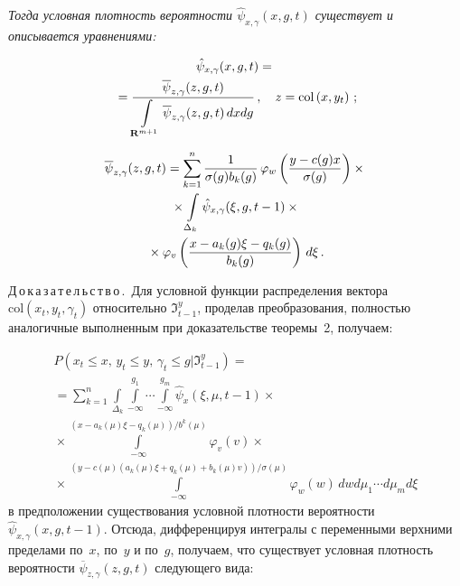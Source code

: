 \begin{multicols}{2}
  \textit{Тогда условная плотность вероятности $\hat{\psi}_{x,\gamma}(x,g,t)$ существует и 
описывается урав\-не\-ниями:}



\noindent
  \begin{multline}
  \hat{\psi}_{x,\gamma}(x,g,t) ={}\\
  {}=\displaystyle\frac{\displaystyle \overline{\psi}_{z,\gamma}(z,g,t)\mathstrut}{\displaystyle \int\limits_{\mathbf{R}^{m+1}}\overline{\psi}_{z,\gamma} (z,g,t)\,dx dg\mathstrut}\,, \quad
z=\mathrm{col}\left( x,y_t\right)\,;   \label{e9-b}
  \end{multline}
  
\vspace*{-12pt}
\noindent
\begin{multline}
  \overline{\psi}_{z,\gamma} (z,g,t) =\sum\limits_{k=1}^n \displaystyle\frac{\displaystyle 1\mathstrut}{\displaystyle \sigma (g) b_k(g)\mathstrut}\,\varphi_w 
\left( \displaystyle\frac{\displaystyle y-c(g)x\mathstrut}{\displaystyle \sigma(g)\mathstrut}\right) \times{}\\
  {}\times \int\limits_{\Delta_k} \hat{\psi}_{x,\gamma} (\xi, g, t-1) \times{}\\
  {}\times \varphi_v\left( \displaystyle\frac{\displaystyle x-a_k(g) 
\xi -q_k(g)\mathstrut}{\displaystyle b_k(g)\mathstrut}\right)\,d\xi\,.
  \label{e10-b}
  \end{multline}
  
  \smallskip
  
  \noindent
  Д\,о\,к\,а\,з\,а\,т\,е\,л\,ь\,с\,т\,в\,о\,.\ Для условной функции распределения вектора $\mathrm{col} 
\left( x_t, y_t, \gamma_t\right)$ относительно $\Im^y_{t-1}$, проделав преобразования, 
полностью аналогичные выполненным при доказательстве теоремы~2, получаем:

\noindent
  \begin{multline*}
  P\left(x_t\leq x,\, y_t\leq y,\, \gamma_t\leq g \vert \Im^y_{t-1}\right)=
 {}\\
{}= \sum\limits_{k=1}^n \int\limits_{\Delta_k} \int\limits_{-\infty}^{g_1}\cdots \int\limits_{-
\infty}^{g_m} \hat{\psi}_x(\xi,\mu,t-1)\times{}\\
{}\times \int\limits_{-\infty}^{(x-a_k(\mu)\xi-q_k(\mu))/b^k(\mu)} 
\varphi_v(v) \times{}\\
{}\times\!\!
\int\limits_{-\infty}^{(y-
c(\mu)(a_k(\mu)\xi+q_k(\mu)+b_k(\mu)v))/\sigma(\mu)}\!\!\!\!\!\!\!\!\!\!\!\!\!\!
\varphi_w(w)\,dw d\mu_1 \cdots d\mu_m 
d\xi
\end{multline*}
в предположении существования условной плотности вероятности 
$\hat{\psi}_{x,\gamma}(x,g,t-1)$. Отсюда, дифференцируя интегралы с переменными 
верхними пределами по~$x$, по~$y$ и по~$g$, получаем, что существует условная 
плотность вероятности $\overline{\psi}_{z,\gamma}(z,g,t)$ следующего вида:


\end{multicols}
